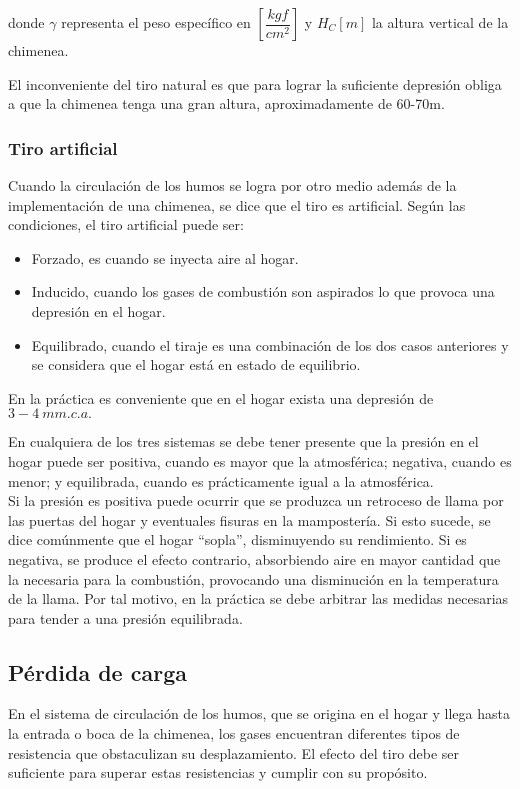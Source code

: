 donde $\gamma$ representa el peso específico en $\left[\dfrac{kgf}{cm^2}\right]$ y $H_C [m]$ la altura vertical de la chimenea.

El inconveniente del tiro natural es que para lograr la suficiente depresión obliga a que la chimenea tenga una gran altura, aproximadamente de 60-70m.

\subsubsection{Tiro artificial}

Cuando la circulación de los humos se logra por otro medio además de la implementación de una chimenea, se dice que el tiro es artificial. Según las condiciones, el tiro artificial puede ser:
\begin{itemize}
	\item Forzado, es cuando se inyecta aire al hogar.
	\item Inducido, cuando los gases de combustión son aspirados lo que provoca una depresión en el hogar.
	\item Equilibrado, cuando el tiraje es una combinación de los dos casos anteriores y se considera que el hogar está en estado de equilibrio.
\end{itemize}

En la práctica es conveniente que en el hogar exista una depresión de $3-4\ mm.c.a.$

En cualquiera de los tres sistemas se debe tener presente que la presión en el hogar puede ser positiva, cuando es mayor que la atmosférica; negativa, cuando es menor; y equilibrada, cuando es prácticamente igual a la atmosférica.\\


Si la presión es positiva puede ocurrir que se produzca un retroceso de llama por las puertas del hogar y eventuales fisuras en la mampostería. Si esto sucede, se dice comúnmente que el hogar ``sopla'', disminuyendo su rendimiento. Si es negativa, se produce el efecto contrario, absorbiendo aire en mayor cantidad que la necesaria para la combustión, provocando una disminución en la temperatura de la llama. Por tal motivo, en la práctica se debe arbitrar las medidas necesarias para tender a una presión equilibrada.

\subsection{Pérdida de carga}

En el sistema de circulación de los humos, que se origina en el hogar y llega hasta la entrada o boca de la chimenea, los gases encuentran diferentes tipos de resistencia que obstaculizan su desplazamiento. El efecto del tiro debe ser suficiente para superar estas resistencias y cumplir con su propósito.\\

